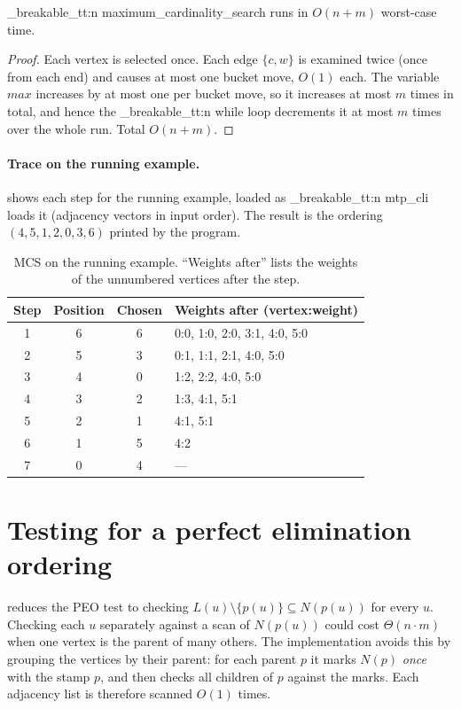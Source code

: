 \documentclass[11pt,a4paper,oneside]{report}
\theoremstyle{plain}
\theoremstyle{definition}
\theoremstyle{remark}
\DeclareRobustCommand{\code}[1]{\mtp_breakable_tt:n {#1}}
\begin{document}
\begin{proposition}\label{prop:mcs-linear}
\code{maximum_cardinality_search} runs in \(O(n+m)\) worst-case time.
\end{proposition}
\begin{proof}
Each vertex is selected once. Each edge \(\{c,w\}\) is examined twice (once from each end) and
causes at most one bucket move, \(O(1)\) each. The variable \(\mathit{max}\) increases by at
most one per bucket move, so it increases at most \(m\) times in total, and hence the
\code{while} loop decrements it at most \(m\) times over the whole run. Total \(O(n+m)\).
\end{proof}

\paragraph{Trace on the running example.}  shows each step for the
running example, loaded as \code{mtp_cli} loads it (adjacency vectors in input order). The
result is the ordering \((4,5,1,2,0,3,6)\) printed by the program.

\begin{table}[ht]
\centering\small
\caption[MCS trace on the running example]{MCS on the running example. ``Weights after'' lists
the weights of the unnumbered vertices after the step.}\label{tab:mcs-trace}
\begin{tabular}{@{}cccl@{}}
\toprule
\textbf{Step} & \textbf{Position} & \textbf{Chosen} & \textbf{Weights after (vertex:weight)}\\
\midrule
1 & 6 & 6 & 0:0, 1:0, 2:0, 3:1, 4:0, 5:0\\
2 & 5 & 3 & 0:1, 1:1, 2:1, 4:0, 5:0\\
3 & 4 & 0 & 1:2, 2:2, 4:0, 5:0\\
4 & 3 & 2 & 1:3, 4:1, 5:1\\
5 & 2 & 1 & 4:1, 5:1\\
6 & 1 & 5 & 4:2\\
7 & 0 & 4 & ---\\
\bottomrule
\end{tabular}
\end{table}

\section{Testing for a perfect elimination ordering}\label{sec:peo-code}
 reduces the PEO test to checking \(L(u)\setminus\{p(u)\}\subseteq
N(p(u))\) for every \(u\). Checking each \(u\) separately against a scan of \(N(p(u))\) could
cost \(\Theta(n\cdot m)\) when one vertex is the parent of many others. The implementation
avoids this by grouping the vertices by their parent: for each parent \(p\) it marks
\(N(p)\) \emph{once} with the stamp \(p\), and then checks all children of \(p\) against the
marks. Each adjacency list is therefore scanned \(O(1)\) times.
\end{document}
